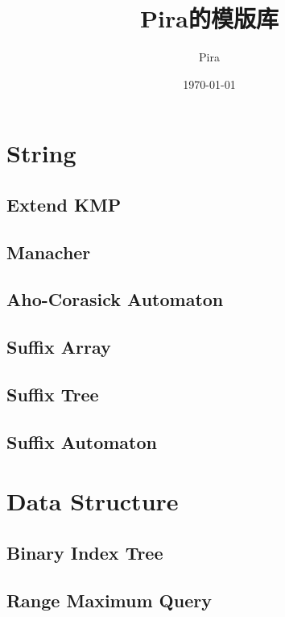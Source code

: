 \documentclass[utf8,8pt]{article}
\title{Pira的模版库}
\author{Pira}
\date{\today}
\begin{document}
\begin{CJK}{UTF8}{gbsn}
\maketitle

\tableofcontents

\clearpage

\section{String}
	\subsection{Extend KMP}
		
	\subsection{Manacher}
		
	\subsection{Aho-Corasick Automaton}
		
	\subsection{Suffix Array}
		
	\subsection{Suffix Tree}
		
	\subsection{Suffix Automaton}
		
\clearpage

\section{Data Structure}
	\subsection{Binary Index Tree}
		
	\subsection{Range Maximum Query}
		

\end{CJK}
\end{document}

